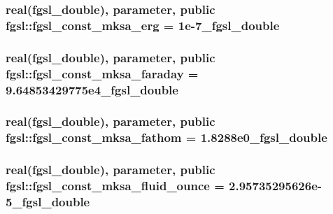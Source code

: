 \subsubsection[{fgsl\+\_\+const\+\_\+mksa\+\_\+erg}]{\setlength{\rightskip}{0pt plus 5cm}real({\bf fgsl\+\_\+double}), parameter, public fgsl\+::fgsl\+\_\+const\+\_\+mksa\+\_\+erg = 1e-\/7\+\_\+fgsl\+\_\+double}\label{namespacefgsl_a7135370afba011fa6c30a3028af76f15}
\hypertarget{namespacefgsl_a7a5c5ad37eb790e7372f127324e5fc9f}{}
\subsubsection[{fgsl\+\_\+const\+\_\+mksa\+\_\+faraday}]{\setlength{\rightskip}{0pt plus 5cm}real({\bf fgsl\+\_\+double}), parameter, public fgsl\+::fgsl\+\_\+const\+\_\+mksa\+\_\+faraday = 9.\+64853429775e4\+\_\+fgsl\+\_\+double}\label{namespacefgsl_a7a5c5ad37eb790e7372f127324e5fc9f}
\hypertarget{namespacefgsl_a1b3e809c97882aeaebf2e325079f38a3}{}
\subsubsection[{fgsl\+\_\+const\+\_\+mksa\+\_\+fathom}]{\setlength{\rightskip}{0pt plus 5cm}real({\bf fgsl\+\_\+double}), parameter, public fgsl\+::fgsl\+\_\+const\+\_\+mksa\+\_\+fathom = 1.\+8288e0\+\_\+fgsl\+\_\+double}\label{namespacefgsl_a1b3e809c97882aeaebf2e325079f38a3}
\hypertarget{namespacefgsl_af688bbef5ebab7dfd674fad9cf5d8bd3}{}
\subsubsection[{fgsl\+\_\+const\+\_\+mksa\+\_\+fluid\+\_\+ounce}]{\setlength{\rightskip}{0pt plus 5cm}real({\bf fgsl\+\_\+double}), parameter, public fgsl\+::fgsl\+\_\+const\+\_\+mksa\+\_\+fluid\+\_\+ounce = 2.\+95735295626e-\/5\+\_\+fgsl\+\_\+double}\label{namespacefgsl_af688bbef5ebab7dfd674fad9cf5d8bd3}
\hypertarget{namespacefgsl_acff74ed42941dc6324409ba0eee894ee}{}
